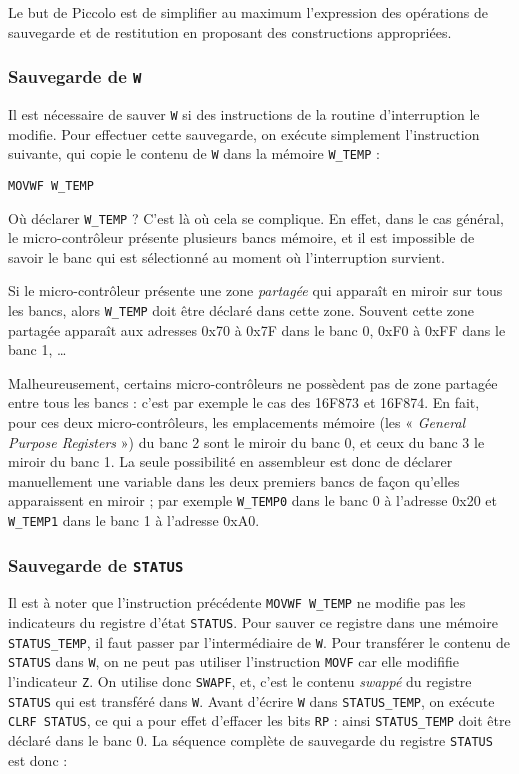 Le but de Piccolo est de simplifier au maximum l'expression des opérations de sauvegarde et de restitution en proposant des constructions appropriées.

\subsubsection{Sauvegarde de \texttt{W}}

Il est nécessaire de sauver \texttt{W} si des instructions de la routine d'interruption le modifie. Pour effectuer cette sauvegarde, on exécute simplement l'instruction suivante, qui copie le contenu de \texttt{W} dans la mémoire \texttt{W\_TEMP} :

\begin{lstlisting}[language=assembleur]
MOVWF W_TEMP 
\end{lstlisting}

Où déclarer \texttt{W\_TEMP} ? C'est là où cela se complique. En effet, dans le cas général, le micro-contrôleur présente plusieurs bancs mémoire, et il est impossible de savoir le banc qui est sélectionné au moment où l'interruption survient.

Si le micro-contrôleur présente une zone \emph{partagée} qui apparaît en miroir sur tous les bancs, alors \texttt{W\_TEMP} doit être déclaré dans cette zone. Souvent cette zone partagée apparaît aux adresses 0x70 à 0x7F dans le banc 0, 0xF0 à 0xFF dans le banc 1, …

Malheureusement, certains micro-contrôleurs ne possèdent pas de zone partagée entre tous les bancs : c'est par exemple le cas des 16F873 et 16F874. En fait, pour ces deux micro-contrôleurs, les emplacements mémoire (les « \emph{General Purpose Registers} ») du banc 2 sont le miroir du banc 0, et ceux du banc 3 le miroir du banc 1. La seule possibilité en assembleur est donc de déclarer manuellement une variable dans les deux premiers bancs de façon qu'elles apparaissent en miroir ; par exemple \texttt{W\_TEMP0} dans le banc 0 à l'adresse 0x20 et \texttt{W\_TEMP1} dans le banc 1 à l'adresse 0xA0.


\subsubsection{Sauvegarde de \texttt{STATUS}}

Il est à noter que l'instruction précédente \texttt{MOVWF W\_TEMP} ne modifie pas les indicateurs du registre d'état \texttt{STATUS}. Pour sauver ce registre dans une mémoire \texttt{STATUS\_TEMP}, il faut passer par l'intermédiaire de \texttt{W}. Pour transférer le contenu de \texttt{STATUS} dans \texttt{W}, on ne peut pas utiliser l'instruction \texttt{MOVF} car elle modififie l'indicateur \texttt{Z}. On utilise donc \texttt{SWAPF}, et, c'est le contenu \emph{swappé} du registre \texttt{STATUS} qui est transféré dans \texttt{W}. Avant d'écrire \texttt{W} dans \texttt{STATUS\_TEMP}, on exécute \texttt{CLRF STATUS}, ce qui a pour effet d'effacer les bits \texttt{RP} : ainsi \texttt{STATUS\_TEMP} doit être déclaré dans le banc 0. La séquence complète de sauvegarde du registre \texttt{STATUS} est donc :

